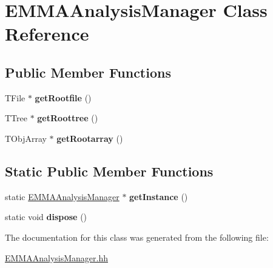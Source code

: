 \hypertarget{classEMMAAnalysisManager}{\section{E\-M\-M\-A\-Analysis\-Manager Class Reference}
\label{classEMMAAnalysisManager}
}
\subsection*{Public Member Functions}
\begin{DoxyCompactItemize}
\item 
\hypertarget{classEMMAAnalysisManager_a126149ed6ad7e03adf3e5dc87c143d33}{T\-File $\ast$ {\bfseries get\-Rootfile} ()}\label{classEMMAAnalysisManager_a126149ed6ad7e03adf3e5dc87c143d33}

\item 
\hypertarget{classEMMAAnalysisManager_adfb53bfacb731ca9e8c5aebaa2a75c8d}{T\-Tree $\ast$ {\bfseries get\-Roottree} ()}\label{classEMMAAnalysisManager_adfb53bfacb731ca9e8c5aebaa2a75c8d}

\item 
\hypertarget{classEMMAAnalysisManager_aead08f08e4976274aeba24c1b6454831}{T\-Obj\-Array $\ast$ {\bfseries get\-Rootarray} ()}\label{classEMMAAnalysisManager_aead08f08e4976274aeba24c1b6454831}

\end{DoxyCompactItemize}
\subsection*{Static Public Member Functions}
\begin{DoxyCompactItemize}
\item 
\hypertarget{classEMMAAnalysisManager_ae5ebfec95e60e4f592a3aad44d20058f}{static \hyperlink{classEMMAAnalysisManager}{E\-M\-M\-A\-Analysis\-Manager} $\ast$ {\bfseries get\-Instance} ()}\label{classEMMAAnalysisManager_ae5ebfec95e60e4f592a3aad44d20058f}

\item 
\hypertarget{classEMMAAnalysisManager_a23b5430979212f4a845437b7482faa84}{static void {\bfseries dispose} ()}\label{classEMMAAnalysisManager_a23b5430979212f4a845437b7482faa84}

\end{DoxyCompactItemize}


The documentation for this class was generated from the following file\-:\begin{DoxyCompactItemize}
\item 
\hyperlink{EMMAAnalysisManager_8hh}{E\-M\-M\-A\-Analysis\-Manager.\-hh}\end{DoxyCompactItemize}

